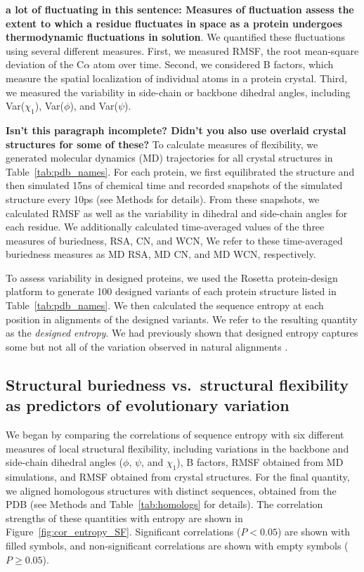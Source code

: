 \documentclass[smallextended]{svjour3}
\begin{document}
\textbf{a lot of fluctuating in this sentence: Measures of fluctuation assess the extent to which a residue fluctuates in space as a protein undergoes thermodynamic fluctuations in solution}. We quantified these fluctuations using several different measures. First, we measured RMSF, the root mean-square deviation of the C$\alpha$ atom over time. Second, we considered B factors, which measure the spatial localization of individual atoms in a protein crystal. Third, we measured the variability in side-chain or backbone dihedral angles, including Var($\chi_1$), Var($\phi$), and Var($\psi$).

\textbf{Isn't this paragraph incomplete? Didn't you also use overlaid crystal structures for some of these?}
To calculate measures of flexibility, we generated molecular dynamics (MD) trajectories for all crystal structures in Table~\ref{tab:pdb_names}. For each protein, we first equilibrated the structure and then simulated 15ns of chemical time and recorded snapshots of the simulated structure every 10ps (see Methods for details). From these snapshots, we calculated RMSF as well as the variability in dihedral and side-chain angles for each residue. We additionally calculated time-averaged values of the three measures of buriedness, RSA, CN, and WCN, We refer to these time-averaged buriedness measures as MD RSA, MD CN, and MD WCN, respectively.

To assess variability in designed proteins, we used the Rosetta protein-design platform to generate 100 designed variants of each protein structure listed in Table~\ref{tab:pdb_names}. We then calculated the sequence entropy at each position in alignments of the designed variants. We refer to the resulting quantity as the \emph{designed entropy}. We had previously shown that designed entropy captures some but not all of the variation observed in natural alignments \citep{Jacksonetal2013}.

\subsection*{Structural buriedness vs.\ structural flexibility as predictors of evolutionary variation}

We began by comparing the correlations of sequence entropy with six different measures of local structural flexibility, including variations in the backbone and side-chain dihedral angles ($\phi$, $\psi$, and $\chi_1$), B factors, RMSF obtained from MD simulations, and RMSF obtained from crystal structures. For the final quantity, we aligned homologous structures with distinct sequences, obtained from the PDB (see Methods and Table~\ref{tab:homologs} for details). The correlation strengths of these quantities with entropy are shown in Figure~\ref{fig:cor_entropy_SF}. Significant correlations ($P<0.05$) are shown with filled symbols, and non-significant correlations are shown with empty symbols ($P\geq0.05$).
\end{document}
